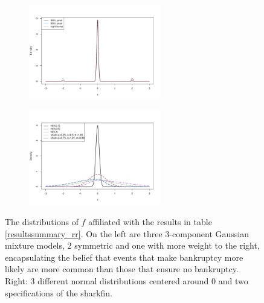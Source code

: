\documentclass[aoas,preprint, 11pt, dvipsnames, table, x11name]{imsart}
\theoremstyle{remark}
\begin{document}
\begin{figure}[ht]
	\centering 
	\begin{subfigure}{.5\textwidth}
		\includegraphics[width=5.75cm]{bump_plots}
	\end{subfigure}%
\begin{subfigure}{.5\textwidth}
	\includegraphics[width=5.75cm]{shark_plots}
\end{subfigure}
\caption{The distributions of $f$ affiliated with the results in table \ref{resultssummary_rr}.  On the left are three 3-component Gaussian mixture models, 2 symmetric and one with more weight to the right, encapsulating the belief that events that make bankruptcy more likely are more common than those that ensure no bankruptcy. Right: 3 different normal distributions centered around 0 and two specifications of the sharkfin. }
\label{f_dist_plots}
\end{figure}
\end{document}
